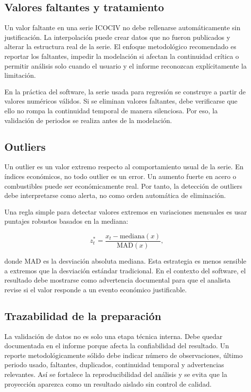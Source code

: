 \subsection{Valores faltantes y tratamiento}

Un valor faltante en una serie ICOCIV no debe rellenarse automáticamente sin justificación. La interpolación puede crear datos que no fueron publicados y alterar la estructura real de la serie. El enfoque metodológico recomendado es reportar los faltantes, impedir la modelación si afectan la continuidad crítica o permitir análisis solo cuando el usuario y el informe reconozcan explícitamente la limitación.

En la práctica del software, la serie usada para regresión se construye a partir de valores numéricos válidos. Si se eliminan valores faltantes, debe verificarse que ello no rompa la continuidad temporal de manera silenciosa. Por eso, la validación de periodos se realiza antes de la modelación.

\subsection{Outliers}

Un outlier es un valor extremo respecto al comportamiento usual de la serie. En índices económicos, no todo outlier es un error. Un aumento fuerte en acero o combustibles puede ser económicamente real. Por tanto, la detección de outliers debe interpretarse como alerta, no como orden automática de eliminación.

Una regla simple para detectar valores extremos en variaciones mensuales es usar puntajes robustos basados en la mediana:

\begin{equation}
    z^{\ast}_t = \frac{x_t - \text{mediana}(x)}{\text{MAD}(x)},
    \label{eq:z_robusto}
\end{equation}

donde \(\text{MAD}\) es la desviación absoluta mediana. Esta estrategia es menos sensible a extremos que la desviación estándar tradicional. En el contexto del software, el resultado debe mostrarse como advertencia documental para que el analista revise si el valor responde a un evento económico justificable.

\subsection{Trazabilidad de la preparación}

La validación de datos no es solo una etapa técnica interna. Debe quedar documentada en el informe porque afecta la confiabilidad del resultado. Un reporte metodológicamente sólido debe indicar número de observaciones, último periodo usado, faltantes, duplicados, continuidad temporal y advertencias relevantes. Así se fortalece la reproducibilidad del análisis y se evita que la proyección aparezca como un resultado aislado sin control de calidad.
